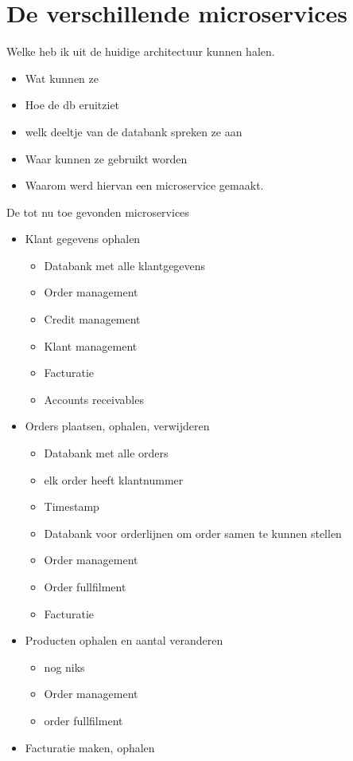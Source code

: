 \section{De verschillende microservices}
Welke heb ik uit de huidige architectuur kunnen halen.
\begin{itemize}
	\item Wat kunnen ze
	\item Hoe de db eruitziet
	\item welk deeltje van de databank spreken ze aan
	\item Waar kunnen ze gebruikt worden
	\item Waarom werd hiervan een microservice gemaakt.
\end{itemize}

De tot nu toe gevonden microservices
\begin{itemize}
	\item Klant gegevens ophalen
		\begin{itemize}
			\item Databank met alle klantgegevens
			\item Order management
			\item Credit management
			\item Klant management
			\item Facturatie
			\item Accounts receivables
		\end{itemize}
	\item Orders plaatsen, ophalen, verwijderen
		\begin{itemize}
			\item Databank met alle orders
			\item elk order heeft klantnummer
			\item Timestamp
			\item Databank voor orderlijnen om order samen te kunnen stellen
			\item Order management
			\item Order fullfilment
			\item Facturatie
		\end{itemize}
	\item Producten ophalen en aantal veranderen
		\begin{itemize}
			\item nog niks
			\item Order management
			\item order fullfilment
		\end{itemize}
	\item Facturatie maken, ophalen

\end{itemize}

